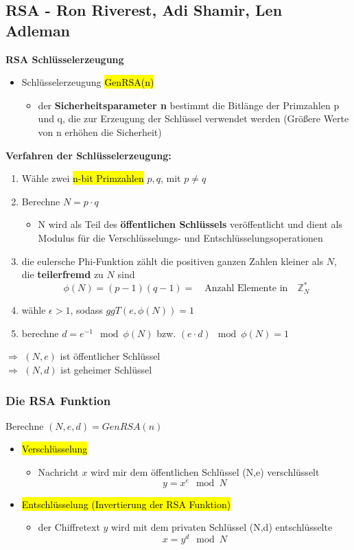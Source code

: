 \documentclass[a4paper, 10pt]{article}
\begin{document}
\subsection{RSA - Ron Riverest, Adi Shamir, Len Adleman}
\textbf{RSA Schlüsselerzeugung}
\begin{itemize}
    \item Schlüsselerzeugung \hl{GenRSA(n)}
    \begin{itemize}
        \item der \textbf{Sicherheitsparameter n} bestimmt die Bitlänge der Primzahlen p und q, die zur Erzeugung der Schlüssel verwendet werden (Größere Werte von n erhöhen die Sicherheit)
    \end{itemize}
\end{itemize}
\textbf{Verfahren der Schlüsselerzeugung:}
\begin{enumerate}
    \item Wähle zwei \hl{n-bit Primzahlen} $p,q$, mit $p \neq q$
    \item Berechne $N = p \cdot q$
    \begin{itemize}
        \item N wird als Teil des \textbf{öffentlichen Schlüssels} veröffentlicht und dient als Modulus für die Verschlüsselungs- und Entschlüsselungsoperationen
    \end{itemize}
    \item die eulersche Phi-Funktion zählt die positiven ganzen Zahlen kleiner als $N$, die \textbf{teilerfremd} zu $N$ sind
    \[
        \phi (N) = (p-1)(q-1) = \quad \text{Anzahl Elemente in} \quad \mathbb{Z}_{N}^*
    \]

    \item wähle $\epsilon > 1$, sodass $ggT(e, \phi (N)) = 1$
    \item berechne $d = e^{-1} \mod \phi(N)$ bzw. $(e \cdot d) \mod \phi (N) = 1$
\end{enumerate}
$\Longrightarrow$ $(N,e)$ ist öffentlicher Schlüssel \\
$\Longrightarrow$ $(N,d)$ ist geheimer Schlüssel

\subsubsection{Die RSA Funktion}
Berechne $(N, e, d) = GenRSA(n)$
\begin{itemize}
    \item \hl{Verschlüsselung}
    \begin{itemize}
        \item Nachricht $x$ wird mir dem öffentlichen Schlüssel (N,e) verschlüsselt
        \[
            y = x^e \mod N
        \]
    \end{itemize}

    \item \hl{Entschlüsselung (Invertierung der RSA Funktion)}
    \begin{itemize}
        \item der Chiffretext $y$ wird mit dem privaten Schlüssel (N,d) entschlüsselte
        \[
            x = y^d \mod N
        \]  
    \end{itemize}
\end{itemize}
\end{document}
